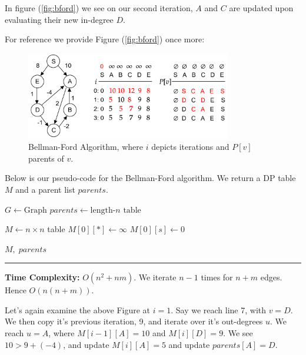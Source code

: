 \noindent
In figure (\ref{fig:bford}) we see on our second iteration, $A$ and $C$ are updated upon evaluating their new in-degree $D$.
\newpage

\noindent
For reference we provide Figure (\ref{fig:bford}) once more:
\begin{figure}[h]
    \centering
    \includegraphics[width=0.8\textwidth]{Sections/dp/bford.png}
    \caption{Bellman-Ford Algorithm, where $i$ depicts iterations and $P[v]$ parents of $v$.}
\end{figure}

\noindent
Below is our pseudo-code for the Bellman-Ford algorithm. We return a DP table $M$ and a parent list $parents$.
\begin{Func}

    \vspace{-.5em}
    \begin{algorithm}[H]
        $G \gets \text{Graph}$ 
        $parents \gets \text{length-}n \text{ table}$ 
        
        $M \gets n \times n$ table 
        $M[0][*] \gets \infty$ 
        $M[0][s] \gets 0$ 
        
        
        \Return $M, \; parents$\;
    \end{algorithm}
    
    \noindent
    \rule{\textwidth}{0.4pt}
    \textbf{Time Complexity:} $O(n^2 + nm)$. We iterate $n-1$ times for $n+m$ edges. Hence $O(n(n+m))$.
\end{Func}
\noindent
Let's again examine the above Figure at $i=1$. Say we reach line 7, with $v=D$. We then copy it's previous iteration,
9, and iterate over it's out-degrees $u$. We reach $u=A$, where $M[i-1][A]=10$ and $M[i][D]=9$. We see $10>9+(-4)$,
and update $M[i][A]=5$ and update $parents[A]=D$.


